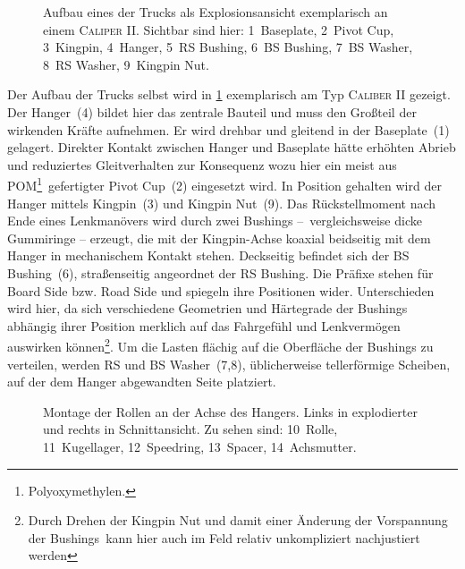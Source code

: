 		\begin{figure}[h]
			\centering
			
			\caption[Explosionsansicht eines der Trucks]{Aufbau eines der Trucks als Explosionsansicht exemplarisch an einem \textsc{Caliper II}. Sichtbar sind hier: 1~Baseplate, 2~Pivot Cup, 3~Kingpin, 4~Hanger, 5~RS Bushing, 6~BS Bushing, 7~BS Washer, 8~RS Washer, 9~Kingpin Nut.}\label{fig:caliper exploded}
		\end{figure}
		Der Aufbau der Trucks selbst wird in \cref{fig:caliper exploded} exemplarisch am Typ \textsc{Caliber II} gezeigt.
		Der Hanger~(4) bildet hier das zentrale Bauteil und muss den Großteil der wirkenden Kräfte aufnehmen.
		Er wird drehbar und gleitend in der Baseplate~(1) gelagert.
		Direkter Kontakt zwischen Hanger und Baseplate hätte erhöhten Abrieb und reduziertes Gleitverhalten zur Konsequenz wozu hier ein meist aus POM\footnote{\hspace{1mm} Polyoxymethylen.}~gefertigter Pivot Cup~(2) eingesetzt wird.
		In Position gehalten wird der Hanger mittels Kingpin~(3) und Kingpin Nut~(9).
		Das Rückstellmoment nach Ende eines Lenkmanövers wird durch zwei Bushings --~vergleichsweise dicke Gummiringe -- erzeugt, die mit der Kingpin-Achse koaxial beidseitig mit dem Hanger in mechanischem Kontakt stehen.
		Deckseitig befindet sich der BS Bushing~(6), straßenseitig angeordnet der RS Bushing.
		Die Präfixe stehen für Board Side bzw. Road Side und spiegeln ihre Positionen wider.
		Unterschieden wird hier, da sich verschiedene Geometrien und Härtegrade der Bushings abhängig ihrer Position merklich auf das Fahrgefühl und Lenkvermögen auswirken können\footnote{\hspace{1mm} Durch Drehen der Kingpin Nut und damit einer Änderung der Vorspannung der Bushings~kann hier auch im Feld relativ unkompliziert nachjustiert werden}.
		Um die Lasten flächig auf die Oberfläche der Bushings zu verteilen, werden RS und BS Washer~(7,8), üblicherweise tellerförmige Scheiben, auf der dem Hanger abgewandten Seite platziert.\par\medskip
		\begin{figure}[h]
			\centering
			
			\caption[Montage der Rollen an der Achse des Hanger]{Montage der Rollen an der Achse des Hangers. Links in explodierter und rechts in Schnittansicht. Zu sehen sind: 10~Rolle, 11~Kugellager, 12~Speedring, 13~Spacer, 14~Achsmutter.}\label{fig:wheel NT exploded}
		\end{figure}
